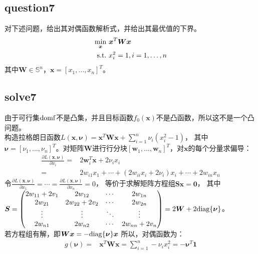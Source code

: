 \documentclass[12pt,a4paper]{ctexart}
\begin{document}
\subsection*{question7}
对下述问题，给出其对偶函数解析式，并给出其最优值的下界。
\begin{align*}
    \min\limits_{\boldsymbol{x}} \ &\boldsymbol{x}^T\boldsymbol{W}\boldsymbol{x} \\
    \rm{s.t.}\  &x_i^2=1,i=1,\ldots,n
\end{align*}
其中$\boldsymbol{W} \in \mathbb{S}^n$，$\boldsymbol{x}=[x_1,\ldots,x_n]^T$。


\subsection*{solve7}
由于可行集$\rm{dom}f$不是凸集，并且目标函数$f_0(\boldsymbol{x})$不是凸函数，所以这不是一个凸问题。\\
构造拉格朗日函数$L(\boldsymbol{x},\boldsymbol{\nu})=\boldsymbol{x}^T\boldsymbol{W}\boldsymbol{x}+\sum\limits_{i=1}^n \nu_i(x_i^2-1)$，
其中$\boldsymbol{\nu}=[\nu_1,\ldots,\nu_n]^T$。对矩阵$\boldsymbol{W}$进行行分块$[\boldsymbol{w}_1,\ldots,\boldsymbol{w}_n]^T$，对$\boldsymbol{x}$的每个分量求偏导：
\begin{align*}
\frac{\partial L(\boldsymbol{x},\boldsymbol{\nu})}{\partial x_i}=&2\boldsymbol{w}_i^T\boldsymbol{x}+2\nu_i x_i\\
                                                              =&2w_{i1}x_1+\cdots+(2w_{ii}x_i+2\nu_i)x_i+\cdots+2w_{in}x_n     
\end{align*}
令$\frac{\partial L(\boldsymbol{x},\boldsymbol{\nu})}{\partial x_1}=\cdots=\frac{\partial L(\boldsymbol{x},\boldsymbol{\nu})}{\partial x_n}=0$，
等价于求解矩阵方程组$\boldsymbol{Sx}=\boldsymbol{0}$，
其中$\boldsymbol{S}=
\begin{pmatrix}
2w_{11}+2v_1 & 2w_{12} &\cdots &2w_{1n} \\
2w_{21} &2w_{22}+2v_2 & \cdots &2w_{2n}\\
\vdots &\vdots &\ddots &\vdots\\
2w_{n1} &2w_{n2} & \cdots & 2w_{nn}+2v_n
\end{pmatrix}=2\boldsymbol{W}+2\rm{diag}\{\boldsymbol{\nu}\}
$。\\
若方程组有解，即$\boldsymbol{Wx}=-\rm{diag}\{\boldsymbol{\nu}\} \boldsymbol{x}$
所以，对偶函数为：
\begin{align*}
g(\boldsymbol{\nu})=&\boldsymbol{x}^T\boldsymbol{W}\boldsymbol{x}=\sum\limits_{i=1}^n -\nu_i x_i^2=-\boldsymbol{\nu}^T\boldsymbol{1}
\end{align*}
\end{document}
